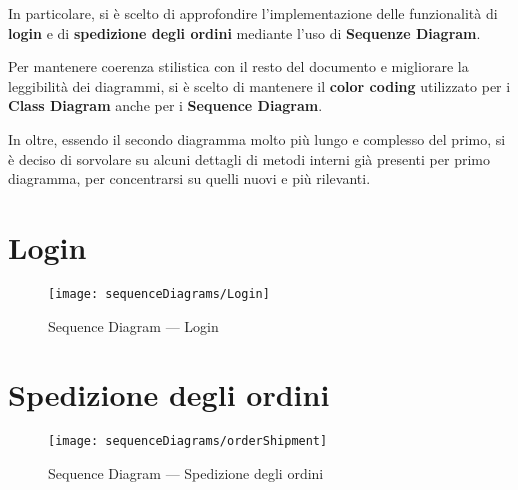 In particolare, si è scelto di approfondire l'implementazione delle funzionalità di \textbf{login} e di \textbf{spedizione degli ordini}
mediante l'uso di \textbf{Sequenze Diagram}.

\begin{note}
  Per mantenere coerenza stilistica con il resto del documento e migliorare la leggibilità dei diagrammi,
  si è scelto di mantenere il \textbf{color coding} utilizzato per i \textbf{Class Diagram} anche 
  per i \textbf{Sequence Diagram}.

  In oltre, essendo il secondo diagramma molto più lungo e complesso del primo, si è deciso di sorvolare su alcuni dettagli
  di metodi interni già presenti per primo diagramma, per concentrarsi su quelli nuovi e più rilevanti.
\end{note}

\newpage

\section{Login}

\begin{figure}[H]
  \centering
  \texttt{[image: sequenceDiagrams/Login]}
  \caption{Sequence Diagram --- Login}
\end{figure}

\newpage

\section{Spedizione degli ordini}

\begin{figure}[H]
  \centering
  \texttt{[image: sequenceDiagrams/orderShipment]}
  \caption{Sequence Diagram --- Spedizione degli ordini}
\end{figure}

